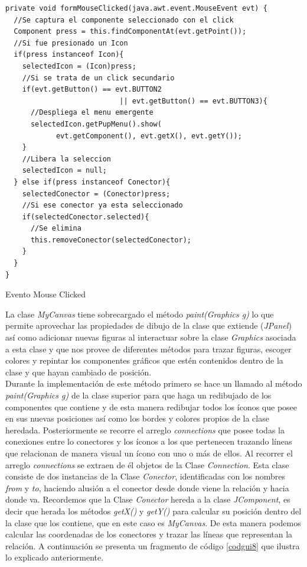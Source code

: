 \begin{codigof}[t]
\begin{verbatim}
private void formMouseClicked(java.awt.event.MouseEvent evt) {
  //Se captura el componente seleccionado con el click
  Component press = this.findComponentAt(evt.getPoint());
  //Si fue presionado un Icon
  if(press instanceof Icon){
    selectedIcon = (Icon)press;
    //Si se trata de un click secundario
    if(evt.getButton() == evt.BUTTON2 
                           || evt.getButton() == evt.BUTTON3){
      //Despliega el menu emergente
      selectedIcon.getPupMenu().show(
            evt.getComponent(), evt.getX(), evt.getY());
    }
    //Libera la seleccion
    selectedIcon = null;
  } else if(press instanceof Conector){
    selectedConector = (Conector)press;
    //Si ese conector ya esta seleccionado
    if(selectedConector.selected){
      //Se elimina
      this.removeConector(selectedConector);
    }
  }
}
\end{verbatim}
\caption{Evento Mouse Clicked}
\label{codgui7}
\end{codigof}

La clase \textit{MyCanvas} tiene sobrecargado el m\'etodo \textit{paint(Graphics g)} lo que permite aprovechar las
propiedades de dibujo de la clase que extiende (\textit{JPanel}) as\'i como adicionar nuevas figuras al
interactuar sobre la clase \textit{Graphics} asociada a esta clase y que nos provee de diferentes m\'etodos para
trazar figuras, escoger colores y repintar los componentes gr\'aficos que est\'en contenidos dentro de la clase y
que hayan cambiado de posici\'on.\\

Durante la implementaci\'on de este m\'etodo primero se hace un llamado al m\'etodo \textit{paint(Graphics g)} de
la clase superior para que haga un redibujado de los componentes que contiene y de esta manera redibujar todos los
\'iconos que posee en sus nuevas posiciones as\'i como los bordes y colores propios de la clase heredada. 
Posteriormente se recorre el arreglo \textit{connections} que posee todas la conexiones entre lo conectores y los
\'iconos a los que pertenecen trazando l\'ineas que relacionan de manera visual un \'icono con uno o m\'as de
ellos. 
Al recorrer el arreglo \textit{connections} se extraen de \'el objetos de la Clase \textit{Connection}.  Esta
clase consiste de dos instancias de la Clase \textit{Conector}, identificadas con los nombres \textit{from} y
\textit{to}, haciendo alusi\'on a el conector desde donde viene la relaci\'on y hacia donde va.  Recordemos que la
Clase \textit{Conector} hereda a la clase \textit{JComponent}, es decir que herada los m\'etodos \textit{getX()} y
\textit{getY()} para calcular su posici\'on dentro del la clase que los contiene, que en este caso es
\textit{MyCanvas}.  De esta manera podemos calcular las coordenadas de los conectores y trazar las l\'ineas que
representan la relaci\'on.  A continuaci\'on se presenta un fragmento de c\'odigo \ref{codgui8} que ilustra lo
explicado anteriormente.

